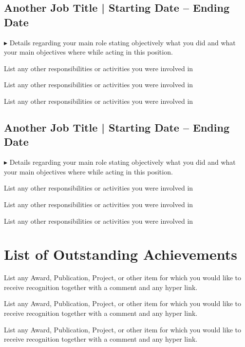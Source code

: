 \documentclass[letterpaper]{leene-resume} %
\begin{document}
{\subsection{Another Job Title | Starting Date – Ending Date}

$\blacktriangleright$ Details regarding your main role stating objectively what you did and what your main objectives where while acting in this position.

\begin{tightitemize}
	\item List any other responsibilities or activities you were involved in
	\item List any other responsibilities or activities you were involved in
	\item List any other responsibilities or activities you were involved in
\end{tightitemize}

\subsectionspace

\subsection{Another Job Title | Starting Date – Ending Date}

$\blacktriangleright$ Details regarding your main role stating objectively what you did and what your main objectives where while acting in this position.

\begin{tightitemize}
	\item List any other responsibilities or activities you were involved in
	\item List any other responsibilities or activities you were involved in
	\item List any other responsibilities or activities you were involved in
\end{tightitemize}

\sectionspace

\section{List of Outstanding Achievements}
\vspace{2mm}
\begin{tightitemize}
\item List any Award, Publication, Project, or other item for which you would like to receive recognition together with a comment and any hyper link.
\item List any Award, Publication, Project, or other item for which you would like to receive recognition together with a comment and any hyper link.
\item List any Award, Publication, Project, or other item for which you would like to receive recognition together with a comment and any hyper link.
\end{tightitemize}


}
\end{document}

